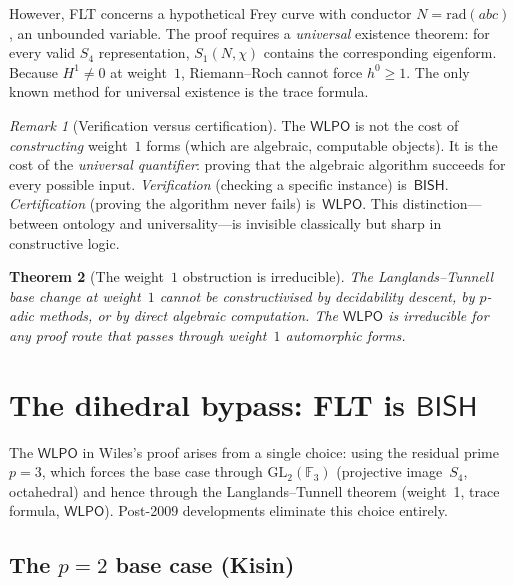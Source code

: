 \documentclass[11pt]{article}
\theoremstyle{plain}
\newtheorem{theorem}{Theorem}[section]
\theoremstyle{definition}
\theoremstyle{remark}
\newtheorem{remark}[theorem]{Remark}
\newcommand{\F}{\mathbb{F}}
\newcommand{\GL}{\mathrm{GL}}
\newcommand{\BISH}{\mathsf{BISH}}
\newcommand{\WLPO}{\mathsf{WLPO}}
\begin{document}
However, FLT concerns a hypothetical Frey curve with
conductor $N = \mathrm{rad}(abc)$, an unbounded variable.  The
proof requires a \emph{universal} existence theorem: for every
valid $S_4$ representation, $S_1(N,\chi)$ contains the
corresponding eigenform.  Because $H^1 \ne 0$ at weight~$1$,
Riemann--Roch cannot force $h^0 \ge 1$.  The only known method
for universal existence is the trace formula.

\begin{remark}[Verification versus certification]%
\label{rem:ontology}
The $\WLPO$ is not the cost of \emph{constructing} weight~$1$
forms (which are algebraic, computable objects).  It is the cost
of the \emph{universal quantifier}: proving that the algebraic
algorithm succeeds for every possible input.
\emph{Verification} (checking a specific instance) is~$\BISH$.
\emph{Certification} (proving the algorithm never fails)
is~$\WLPO$.  This distinction---between ontology and
universality---is invisible classically but sharp in
constructive logic.
\end{remark}

\begin{theorem}[The weight~$1$ obstruction is irreducible]%
\label{thm:weight1}
The Langlands--Tunnell base change at weight~$1$ cannot be
constructivised by decidability descent, by $p$-adic methods,
or by direct algebraic computation.  The $\WLPO$ is
irreducible for any proof route that passes through weight~$1$
automorphic forms.
\end{theorem}


\section{The dihedral bypass: FLT is \texorpdfstring{$\BISH$}{BISH}}%
\label{sec:bypass}

The $\WLPO$ in Wiles's proof arises from a single choice:
using the residual prime $p = 3$, which forces the base case
through $\GL_2(\F_3)$ (projective image~$S_4$, octahedral)
and hence through the Langlands--Tunnell theorem (weight~1,
trace formula, $\WLPO$).  Post-2009 developments eliminate
this choice entirely.

\subsection{The $p = 2$ base case (Kisin)}
\end{document}
